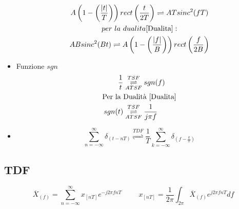 \begin{itemize}
{\begin{gather}
                    A\left(1-\left(\frac{|t|}{T}\right)\right)rect \left(\frac{t}{2T}\right) \rightleftharpoons ATsinc^2(fT)\nonumber\\
                    per\ la\ dualita \ref{Dualita}: \nonumber \\
                    ABsinc^2(Bt) \rightleftharpoons A\left(1-\left(\frac{|f|}{B}\right)\right)rect \left(\frac{f}{2B}\right) \nonumber
                \end{gather}                
            }
            \item {Funzione $sgn$\\
                \begin{align}
                    \frac{1}{t} &\overunderset{TSF}{ATSF}{\rightleftharpoons}  sgn(f) \nonumber \\
                    \text{Per la }&\text{Dualità \ref{Dualita}}\nonumber \\
                    sgn(t) &\overunderset{TSF}{ATSF}{\rightleftharpoons} \frac{1}{j\pi f} \nonumber
                \end{align}
            }
            \item{
                \[\sum_{n=-\infty}^{\infty}\delta_{(t-nT)} \overset{TDF}{\rightleftharpoons} \frac{1}{T} \sum_{k=-\infty}^{\infty} \delta_{(f-\frac{k}{T})}\nonumber\]
            }
        \end{itemize} 
    \subsection{TDF}
        \[
            \overline{X}_{(f)} = \sum_{n=-\infty}^{\infty} x_{[nT]}e^{-j2\pi fnT} \hspace{1cm} x_{[nT]} = \frac{1}{2\pi} \int_{2\pi} \overline{X}_{(f)}e^{j2\pi fnT} df
        \]

